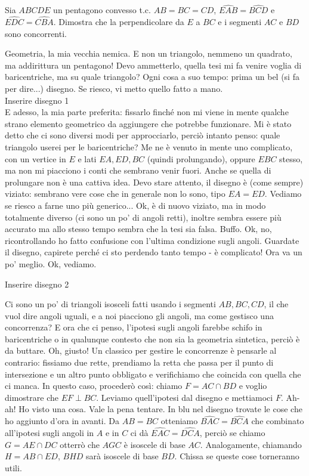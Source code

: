 \begin{prob}
  Sia $ABCDE$ un pentagono convesso t.c. $AB=BC=CD$, $\widehat{EAB}=\widehat{BCD}$ e $\widehat{EDC}=\widehat{CBA}$. Dimostra che la perpendicolare da $E$ a $BC$ e i segmenti $AC$ e $BD$ sono concorrenti.
\end{prob}

\begin{sol}
  Geometria, la mia vecchia nemica. E non un triangolo, nemmeno un quadrato, ma addirittura un pentagono! Devo ammetterlo, quella tesi mi fa venire voglia di baricentriche, ma su quale triangolo? Ogni cosa a suo tempo: prima un bel (si fa per dire...) disegno. Se riesco, vi metto quello fatto a mano. \\

  Inserire disegno 1 \\

  E adesso, la mia parte preferita: fissarlo finché non mi viene in mente qualche strano elemento geometrico da aggiungere che potrebbe funzionare. Mi è stato detto che ci sono diversi modi per approcciarlo, perciò intanto penso: quale triangolo userei per le baricentriche? Me ne è venuto in mente uno complicato, con un vertice in $E$ e lati $EA, ED, BC$ (quindi prolungando), oppure $EBC$ stesso, ma non mi piacciono i conti che sembrano venir fuori. Anche se quella di prolungare non è una cattiva idea. Devo stare attento, il disegno è (come sempre) viziato: sembrano vere cose che in generale non lo sono, tipo $EA=ED$. Vediamo se riesco a farne uno più generico... Ok, è di nuovo viziato, ma in modo totalmente diverso (ci sono un po' di angoli retti), inoltre sembra essere più accurato ma allo stesso tempo sembra che la tesi sia falsa. Buffo. Ok, no, ricontrollando ho fatto confusione con l'ultima condizione sugli angoli. Guardate il disegno, capirete perché ci sto perdendo tanto tempo - è complicato! Ora va un po' meglio. Ok, vediamo.

  Inserire disegno 2

  Ci sono un po' di triangoli isosceli fatti usando i segmenti $AB, BC, CD$, il che vuol dire angoli uguali, e a noi piacciono gli angoli, ma come gestisco una concorrenza? E ora che ci penso, l'ipotesi sugli angoli farebbe schifo in baricentriche o in qualunque contesto che non sia la geometria sintetica, perciò è da buttare. Oh, giusto! Un classico per gestire le concorrenze è pensarle al contrario: fissiamo due rette, prendiamo la retta che passa per il punto di intersezione e un altro punto obbligato e verifichiamo che coincida con quella che ci manca. In questo caso, procederò così: chiamo $F=AC \cap BD$ e voglio dimostrare che $EF \perp BC$. Leviamo quell'ipotesi dal disegno e mettiamoci $F$. Ah-ah! Ho visto una cosa. Vale la pena tentare. In blu nel disegno trovate le cose che ho aggiunto d'ora in avanti. Da $AB=BC$ otteniamo $\widehat{BAC}=\widehat{BCA}$ che combinato all'ipotesi sugli angoli in $A$ e in $C$ ci dà $\widehat{EAC}=\widehat{DCA}$, perciò se chiamo $G=AE \cap DC$ otterrò che $AGC$ è isoscele di base $AC$. Analogamente, chiamando $H=AB \cap ED$, $BHD$ sarà isoscele di base $BD$. Chissa se queste cose torneranno utili. \\


\end{sol}
